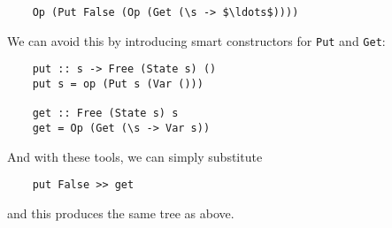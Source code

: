 \documentclass[a4paper,12pt]{article}
\theoremstyle{remark}
\begin{document}
\begin{lstlisting}
    Op (Put False (Op (Get (\s -> $\ldots$))))  \end{lstlisting}

We can avoid this by introducing smart constructors for \lstinline{Put} and
\lstinline{Get}:

\begin{lstlisting}
    put :: s -> Free (State s) ()
    put s = op (Put s (Var ()))

    get :: Free (State s) s
    get = Op (Get (\s -> Var s))  \end{lstlisting}

And with these tools, we can simply substitute

\begin{lstlisting}
    put False >> get  \end{lstlisting}

and this produces the same tree as above.
\end{document}
